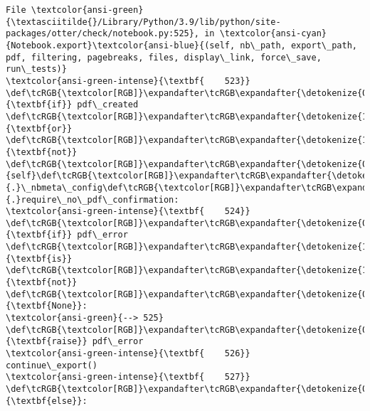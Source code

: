 \documentclass[11pt]{article}
\begin{document}
\begin{Verbatim}[commandchars=\\\{\}, frame=single, framerule=2mm, rulecolor=\color{outerrorbackground}]
File \textcolor{ansi-green}{\textasciitilde{}/Library/Python/3.9/lib/python/site-packages/otter/check/notebook.py:525}, in \textcolor{ansi-cyan}{Notebook.export}\textcolor{ansi-blue}{(self, nb\_path, export\_path, pdf, filtering, pagebreaks, files, display\_link, force\_save, run\_tests)}
\textcolor{ansi-green-intense}{\textbf{    523}} \def\tcRGB{\textcolor[RGB]}\expandafter\tcRGB\expandafter{\detokenize{0,135,0}}{\textbf{if}} pdf\_created \def\tcRGB{\textcolor[RGB]}\expandafter\tcRGB\expandafter{\detokenize{175,0,255}}{\textbf{or}} \def\tcRGB{\textcolor[RGB]}\expandafter\tcRGB\expandafter{\detokenize{175,0,255}}{\textbf{not}} \def\tcRGB{\textcolor[RGB]}\expandafter\tcRGB\expandafter{\detokenize{0,135,0}}{self}\def\tcRGB{\textcolor[RGB]}\expandafter\tcRGB\expandafter{\detokenize{98,98,98}}{.}\_nbmeta\_config\def\tcRGB{\textcolor[RGB]}\expandafter\tcRGB\expandafter{\detokenize{98,98,98}}{.}require\_no\_pdf\_confirmation:
\textcolor{ansi-green-intense}{\textbf{    524}}     \def\tcRGB{\textcolor[RGB]}\expandafter\tcRGB\expandafter{\detokenize{0,135,0}}{\textbf{if}} pdf\_error \def\tcRGB{\textcolor[RGB]}\expandafter\tcRGB\expandafter{\detokenize{175,0,255}}{\textbf{is}} \def\tcRGB{\textcolor[RGB]}\expandafter\tcRGB\expandafter{\detokenize{175,0,255}}{\textbf{not}} \def\tcRGB{\textcolor[RGB]}\expandafter\tcRGB\expandafter{\detokenize{0,135,0}}{\textbf{None}}:
\textcolor{ansi-green}{--> 525}         \def\tcRGB{\textcolor[RGB]}\expandafter\tcRGB\expandafter{\detokenize{0,135,0}}{\textbf{raise}} pdf\_error
\textcolor{ansi-green-intense}{\textbf{    526}}     continue\_export()
\textcolor{ansi-green-intense}{\textbf{    527}} \def\tcRGB{\textcolor[RGB]}\expandafter\tcRGB\expandafter{\detokenize{0,135,0}}{\textbf{else}}:


\end{Verbatim}
\end{document}

